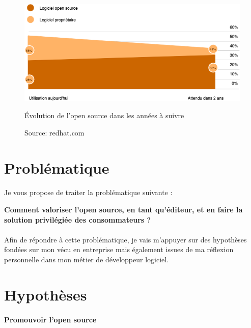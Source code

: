 					\begin{figure}[!htb]
						\center
						\includegraphics[scale=0.60]{./img/osinentreprise.png}
						\caption{Évolution de l'open source dans les années à suivre}
						\caption*{\color{silver}Source: redhat.com}					
					\end{figure}

					\newpage

	\section{Problématique}
		\paragraph*{}

			Je vous propose de traiter la problématique suivante :
			\begin{center}
				\begin{displayquote}
					\textbf{Comment valoriser l'open source, en tant qu'éditeur, et en faire la solution privilégiée des consommateurs ?}
				\end{displayquote}
			\end{center}

		\paragraph*{}
			
			Afin de répondre à cette problématique, je vais m'appuyer sur des hypothèses fondées sur mon vécu en entreprise mais également issues de ma réflexion personnelle dans mon métier de développeur logiciel.

	\section{Hypothèses}

		\paragraph{Promouvoir l'open source\\}

